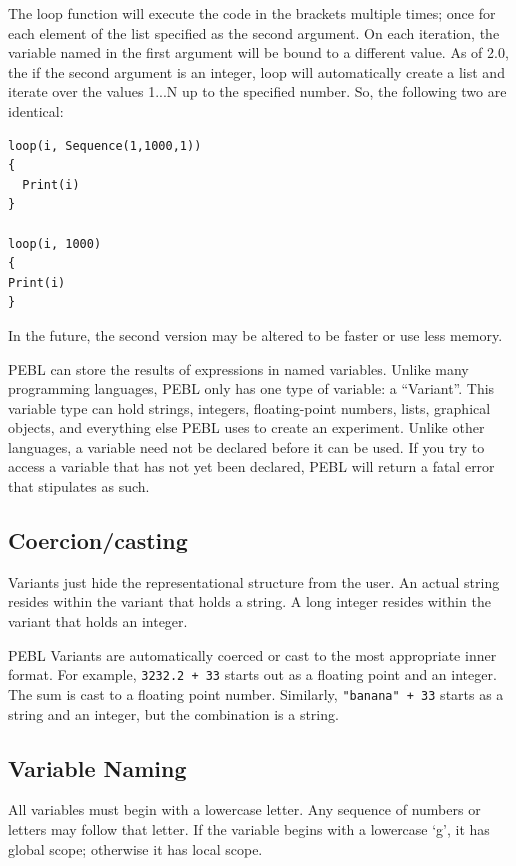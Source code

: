 The loop function will execute the code in the brackets multiple times; once for each element of the list specified as the second argument.  On each iteration, the variable named in the first argument will be bound to a different value.  As of 2.0, the if the second argument is an integer, loop will automatically create a list and iterate over the values 1...N up to the specified number.  So, the following two are identical:

\begin{verbatim}
loop(i, Sequence(1,1000,1))
{
  Print(i)
}

loop(i, 1000)
{
Print(i)
}

\end{verbatim}
In the future, the second version may be altered to be faster or use less memory.

\vfill
{}

PEBL can store the results of expressions in
named variables.  Unlike many programming languages, PEBL
only has one type of variable: a ``Variant''. This variable
type can hold strings, integers, floating-point numbers, lists,
graphical objects, and everything else PEBL uses to create an
experiment.  Unlike other languages, a variable need not be
declared before it can be used.  If you try to access a variable that
has not yet been declared, PEBL will return a fatal error that stipulates as such.


\subsection{Coercion/casting}

Variants  just hide the representational structure
from the user. An actual string resides within the variant that holds a string. A long integer resides within the variant that holds an integer.

PEBL Variants are automatically coerced or cast to the
most appropriate inner format.  For example, \texttt{3232.2 + 33}
starts out as a floating point and an integer.  The sum is
cast to a floating point number. Similarly, \texttt{"banana" + 33}
starts as a string and an integer, but the combination is a string.


\subsection{Variable Naming}

All variables must begin with a lowercase letter. Any sequence of numbers or letters may follow that letter. If the variable begins with a lowercase `g', it has global scope; otherwise it has local scope.

